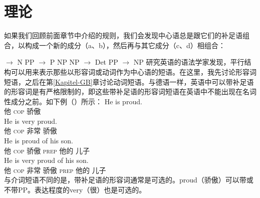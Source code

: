 \section{\xbarc 理论}
\label{sec-xbar}

如果我们回顾前面章节中介绍的规则，我们会发现中心语总是跟它们的补足语组合，以构成一个新的成分（a、b），然后再与其它成分（c、d）相组合：

\eal
\ex \nbar $\to$ N PP
\ex \pbar $\to$ P NP
\ex\label{Regel-NP-Xbar}
    NP $\to$ Det \nbar
\ex PP $\to$ NP \pbar
\zl
%
研究英语的语法学家发现，平行结构可以用来表示那些以形容词或动词作为中心语的短语。在这里，我先讨论形容词短语，之后在第\ref{Kapitel-GB}章讨论动词短语。与德语一样，英语中可以带补足语的形容词是有严格限制的，即这些带补足语的形容词短语在英语中不能出现在名词性成分之前。如下例（）所示：
\eal
\ex 
\gll He is proud.\\
     他 \textsc{cop} 骄傲\\
\ex 
\gll He is very proud.\\
他 \textsc{cop} 非常 骄傲\\
\ex 
\gll He is proud of his son.\\
他 \textsc{cop} 骄傲 \textsc{prep} 他的 儿子\\
\ex 
\gll He is very proud of his son.\\
他 \textsc{cop} 非常 骄傲 \textsc{prep} 他的 儿子\\
\zl
与介词短语不同的是，带补足语的形容词通常是可选的。proud（骄傲）可以带或不带PP。表达程度的very（很）也是可选的。

